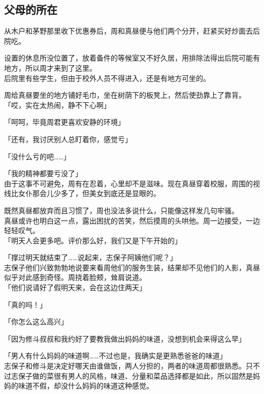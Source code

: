 \subsection{父母的所在}

从木户和茅野那里收下优惠券后，周和真昼便与他们两个分开，赶紧买好炒面去后院吃。

设置的休息所没位置了，放着备件的等候室又不好久居，用排除法得出后院可能有地方，所以周才来到了这里。\\

后院里有些学生，但由于校外人员不得进入，还是有地方可坐的。

周给真昼要坐的地方铺好毛巾，坐在树荫下的板凳上，然后使劲靠上了靠背。\\

「哎，实在太热闹，静不下心啊」

「呵呵，毕竟周君更喜欢安静的环境」

「还有，我讨厌别人总盯着你，感觉亏」

「没什么亏的吧……」

「我的精神都要亏没了」\\

由于这事不可避免，周有在忍着，心里却不是滋味。现在真昼穿着校服，周围的视线比女仆那会儿少多了，但美女到底还是显眼的。

既然真昼都放弃而且习惯了，周也没法多说什么，只能像这样发几句牢骚。\\

真昼或许也明白这一点，露出困扰的苦笑，然后摸周的头哄他。周一边接受，一边轻轻叹气。\\

「明天人会更多吧。评价那么好，我们又是下午开始的」

「撑过明天就结束了……说起来，志保子阿姨他们呢？」\\

志保子他们兴致勃勃地说要来看周他们的服务生装，结果却不见他们的人影，真昼似乎对此感到奇怪。周挠着脸颊，耸肩说道。\\

「他们说请好了假明天来，会在这边住两天」

「真的吗！」

「你怎么这么高兴」

「因为修斗叔叔和我约好了要教我做出妈妈的味道，没想到机会来得这么早」

「男人有什么妈妈的味道啊……不过也是，我确实是更熟悉爸爸的味道」\\

志保子和修斗是决定好哪天由谁做饭，两人分担的，两者的味道周都很熟悉。只不过志保子做的菜很有男人的风格，味道、分量和菜品选择都是如此，所以固然是妈妈的味道不假，却没什么妈妈的味道这种感觉。

